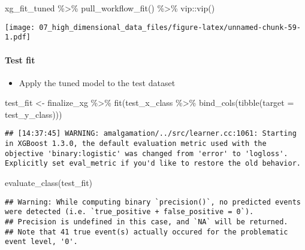 \documentclass[
]{book}
\newenvironment{Shaded}{\begin{snugshade}}{\end{snugshade}}
\newcommand{\AttributeTok}[1]{\textcolor[rgb]{0.77,0.63,0.00}{#1}}
\newcommand{\FunctionTok}[1]{\textcolor[rgb]{0.00,0.00,0.00}{#1}}
\newcommand{\NormalTok}[1]{#1}
\newcommand{\OtherTok}[1]{\textcolor[rgb]{0.56,0.35,0.01}{#1}}
\newcommand{\SpecialCharTok}[1]{\textcolor[rgb]{0.00,0.00,0.00}{#1}}
\providecommand{\tightlist}{%
  \setlength{\itemsep}{0pt}\setlength{\parskip}{0pt}}
\begin{document}
\begin{Shaded}
\begin{Highlighting}[]
\NormalTok{xg\_fit\_tuned }\SpecialCharTok{\%\textgreater{}\%}
  \FunctionTok{pull\_workflow\_fit}\NormalTok{() }\SpecialCharTok{\%\textgreater{}\%}
\NormalTok{  vip}\SpecialCharTok{::}\FunctionTok{vip}\NormalTok{()}
\end{Highlighting}
\end{Shaded}

\texttt{[image: 07\_high\_dimensional\_data\_files/figure-latex/unnamed-chunk-59-1.pdf]}

\hypertarget{test-fit-3}{%
\paragraph{Test fit}\label{test-fit-3}}

\begin{itemize}
\tightlist
\item
  Apply the tuned model to the test dataset
\end{itemize}

\begin{Shaded}
\begin{Highlighting}[]
\NormalTok{test\_fit }\OtherTok{\textless{}{-}}\NormalTok{ finalize\_xg }\SpecialCharTok{\%\textgreater{}\%}
  \FunctionTok{fit}\NormalTok{(test\_x\_class }\SpecialCharTok{\%\textgreater{}\%} \FunctionTok{bind\_cols}\NormalTok{(}\FunctionTok{tibble}\NormalTok{(}\AttributeTok{target =}\NormalTok{ test\_y\_class)))}
\end{Highlighting}
\end{Shaded}

\begin{verbatim}
## [14:37:45] WARNING: amalgamation/../src/learner.cc:1061: Starting in XGBoost 1.3.0, the default evaluation metric used with the objective 'binary:logistic' was changed from 'error' to 'logloss'. Explicitly set eval_metric if you'd like to restore the old behavior.
\end{verbatim}

\begin{Shaded}
\begin{Highlighting}[]
\FunctionTok{evaluate\_class}\NormalTok{(test\_fit)}
\end{Highlighting}
\end{Shaded}

\begin{verbatim}
## Warning: While computing binary `precision()`, no predicted events were detected (i.e. `true_positive + false_positive = 0`). 
## Precision is undefined in this case, and `NA` will be returned.
## Note that 41 true event(s) actually occured for the problematic event level, '0'.
\end{verbatim}
\end{document}
